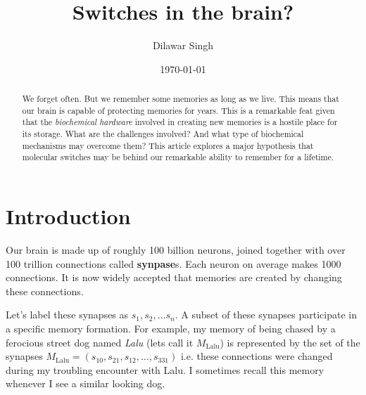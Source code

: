\documentclass[]{resonance}
\title{Switches in the brain?}
\author{Dilawar Singh}
\date{\today}
\begin{document}
\maketitle



\begin{abstract}

    We forget often. But we remember some memories as long as we live.
    This means that our brain is capable of protecting memories for years.
    This is a remarkable feat given that the \emph{biochemical hardware}
    involved in creating new memories is a hostile place for
    its storage.  What are the challenges involved? And what type of 
    biochemical mechanisms may overcome them? This article explores a major
    hypothesis that molecular switches may be behind our remarkable ability to
    remember for a lifetime.

\end{abstract}

\maketitle
{}

\section{Introduction}\label{sec:intro}

Our brain is made up of roughly 100 billion neurons, joined together with over
100 trillion connections called \textbf{synpase}s. Each neuron on average makes
1000 connections. It is now widely accepted that memories are created by
changing these connections. 

Let's label these synapses as $s_1, s_2, \ldots s_n$. A subset of these synapses
participate in a specific memory formation. For example, my memory of being
chased by a ferocious street dog named \emph{Lalu} (lets call it
$M_\text{Lalu}$) is represented by the set of the synapses
$M_\text{Lalu}=(s_{10}, s_{21}, s_{12},\ldots,s_{331})$ i.e. these connections
were changed during my troubling encounter with Lalu. I sometimes recall this
memory whenever I see a similar looking dog. 
\end{document}
